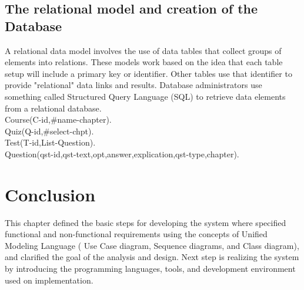 \subsection{The relational model and creation of the Database}

A relational data model involves the use of data tables that collect groups of elements into relations. These models work based on the idea that each table setup will include a primary key or identifier. Other tables use that identifier to provide "relational" data links and results. Database administrators use something called Structured Query Language (SQL) to retrieve data elements from a relational database.\cite{Techopedia-relational-model} \\
Course(C-id,\#name-chapter).\\
Quiz(Q-id,\#select-chpt).\\
Test(T-id,List-Question).\\
Question(qst-id,qst-text,opt,answer,explication,qst-type,chapter).\\


\section{Conclusion}
This chapter defined the basic steps for developing the system where specified functional and
non-functional requirements using the concepts of Unified Modeling Language ( Use Case
diagram, Sequence diagrams, and Class diagram), and clarified the goal of the analysis and
design. Next step is realizing the system
by introducing the programming languages, tools, and development environment used on
implementation.\\







